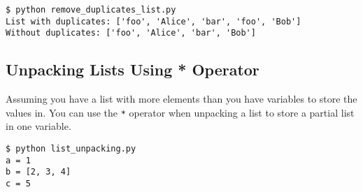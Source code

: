

\begin{lstlisting}[caption=Output of remove\_duplicates\_list.py]
$ python remove_duplicates_list.py
List with duplicates: ['foo', 'Alice', 'bar', 'foo', 'Bob']
Without duplicates: ['foo', 'Alice', 'bar', 'Bob']
\end{lstlisting}


\subsection{Unpacking Lists Using * Operator}

Assuming you have a list with more elements than you have variables to store the values in.
You can use the \lstinline{*} operator when unpacking a list to store a partial list in one variable.



\begin{lstlisting}[caption=Output of list\_unpacking.py]
$ python list_unpacking.py
a = 1
b = [2, 3, 4]
c = 5
\end{lstlisting}

